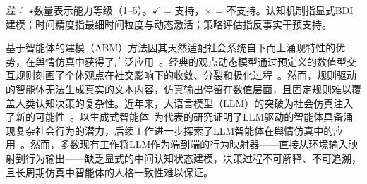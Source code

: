 \documentclass[lettersize,journal]{IEEEtran}
\begin{document}
\begin{table}[!t]
\centering
\caption{POSIM与现有舆情仿真平台的能力对比}
\label{tab:comparison}
\renewcommand{\arraystretch}{1.0}
\vspace{2pt}
{\scriptsize \textit{注：} $\star$数量表示能力等级（1--5）。$\checkmark$ = 支持，$\times$ = 不支持。认知机制指显式BDI建模；时间精度指最细时间粒度与动态激活；策略评估指反事实干预支持。}
\end{table}

基于智能体的建模（ABM）方法因其天然适配社会系统自下而上涌现特性的优势，在舆情仿真中获得了广泛应用~\cite{macal_tutorial_2010}。经典的观点动态模型通过预定义的数值型交互规则刻画了个体观点在社交影响下的收敛、分裂和极化过程~\cite{castellano_statistical_2009}。然而，规则驱动的智能体无法生成真实的文本内容，仿真输出停留在数值层面，且固定规则难以覆盖人类认知决策的复杂性。近年来，大语言模型（LLM）的突破为社会仿真注入了新的可能性~\cite{wang_survey_2024}。以生成式智能体~\cite{park_generative_2023}为代表的研究证明了LLM驱动的智能体具备涌现复杂社会行为的潜力，后续工作进一步探索了LLM智能体在舆情仿真中的应用~\cite{gao_s3_2023,chuang_simulating_2024}。然而，多数现有工作将LLM作为端到端的行为映射器——直接从环境输入映射到行为输出——缺乏显式的中间认知状态建模，决策过程不可解释、不可追溯，且长周期仿真中智能体的人格一致性难以保证。
\end{document}
